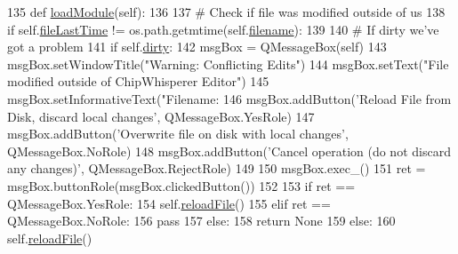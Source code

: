 \begin{DoxyCode}
135     \textcolor{keyword}{def }\hyperlink{classsoftware_1_1chipwhisperer_1_1analyzer_1_1utils_1_1scripteditor_1_1MainScriptEditor_a306c7b2ca41d192a0a2c79914d7f0640}{loadModule}(self):
136 
137         \textcolor{comment}{# Check if file was modified outside of us}
138         \textcolor{keywordflow}{if} self.\hyperlink{classsoftware_1_1chipwhisperer_1_1analyzer_1_1utils_1_1scripteditor_1_1MainScriptEditor_a87abe08a2e6c498cd3d609988229294c}{fileLastTime} != os.path.getmtime(self.\hyperlink{classsoftware_1_1chipwhisperer_1_1analyzer_1_1utils_1_1scripteditor_1_1MainScriptEditor_ad28af7fb96b78c1d45631d308c27d69d}{filename}):
139 
140             \textcolor{comment}{# If dirty we've got a problem}
141             \textcolor{keywordflow}{if} self.\hyperlink{classsoftware_1_1chipwhisperer_1_1analyzer_1_1utils_1_1scripteditor_1_1MainScriptEditor_aa9eead325a22234bc99cd8d6ff2e9b7b}{dirty}:
142                 msgBox = QMessageBox(self)
143                 msgBox.setWindowTitle(\textcolor{stringliteral}{"Warning: Conflicting Edits"})
144                 msgBox.setText(\textcolor{stringliteral}{"File modified outside of ChipWhisperer Editor"})
145                 msgBox.setInformativeText(\textcolor{stringliteral}{"Filename: %
146                 msgBox.addButton(\textcolor{stringliteral}{'Reload File from Disk, discard local changes'}, QMessageBox.YesRole)
147                 msgBox.addButton(\textcolor{stringliteral}{'Overwrite file on disk with local changes'}, QMessageBox.NoRole)
148                 msgBox.addButton(\textcolor{stringliteral}{'Cancel operation (do not discard any changes)'}, QMessageBox.RejectRole)
149 
150                 msgBox.exec\_()
151                 ret = msgBox.buttonRole(msgBox.clickedButton())
152 
153                 \textcolor{keywordflow}{if} ret == QMessageBox.YesRole:
154                     self.\hyperlink{classsoftware_1_1chipwhisperer_1_1analyzer_1_1utils_1_1scripteditor_1_1MainScriptEditor_adde1ee78719417deaf23c0abcf3c42c3}{reloadFile}()
155                 \textcolor{keywordflow}{elif} ret == QMessageBox.NoRole:
156                     \textcolor{keywordflow}{pass}
157                 \textcolor{keywordflow}{else}:
158                     \textcolor{keywordflow}{return} \textcolor{keywordtype}{None}
159             \textcolor{keywordflow}{else}:
160                 self.\hyperlink{classsoftware_1_1chipwhisperer_1_1analyzer_1_1utils_1_1scripteditor_1_1MainScriptEditor_adde1ee78719417deaf23c0abcf3c42c3}{reloadFile}()
}
\end{DoxyCode}
